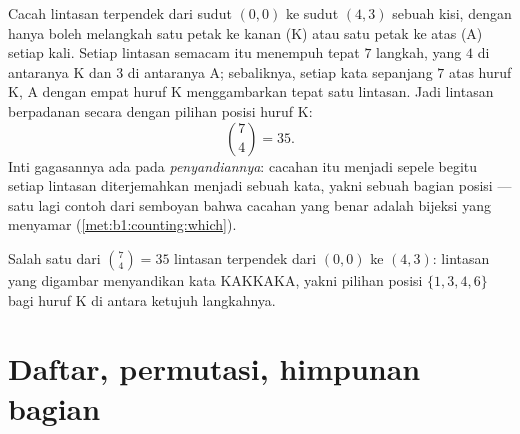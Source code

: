 \begin{example}\label{ex:b1:counting:paths}
Cacah lintasan terpendek dari sudut $(0,0)$ ke sudut
$(4, 3)$ sebuah kisi, dengan hanya boleh melangkah satu petak ke kanan (K)
atau satu petak ke atas (A) setiap kali. Setiap lintasan semacam itu
menempuh tepat $7$ langkah, yang
$4$ di antaranya K dan $3$ di antaranya A; sebaliknya, setiap kata sepanjang $7$ atas
huruf K, A dengan empat huruf K menggambarkan tepat satu lintasan. Jadi lintasan
berpadanan secara  dengan pilihan posisi
huruf K:
\[
\binom{7}{4} = 35 .
\]
Inti gagasannya ada pada \emph{penyandiannya}: cacahan itu menjadi sepele
begitu setiap lintasan diterjemahkan menjadi sebuah kata, yakni sebuah
 bagian posisi --- satu lagi contoh dari semboyan bahwa cacahan
yang benar adalah bijeksi yang menyamar (\cref{met:b1:counting:which}).
\end{example}

\begin{omfigure}

{\small Salah satu dari $\binom74 = 35$ lintasan terpendek dari $(0,0)$ ke
$(4,3)$: lintasan yang digambar menyandikan kata KAKKAKA, yakni pilihan
posisi $\{1,3,4,6\}$ bagi huruf K di antara ketujuh
langkahnya.}
\end{omfigure}

\section{Daftar, permutasi, himpunan bagian}

